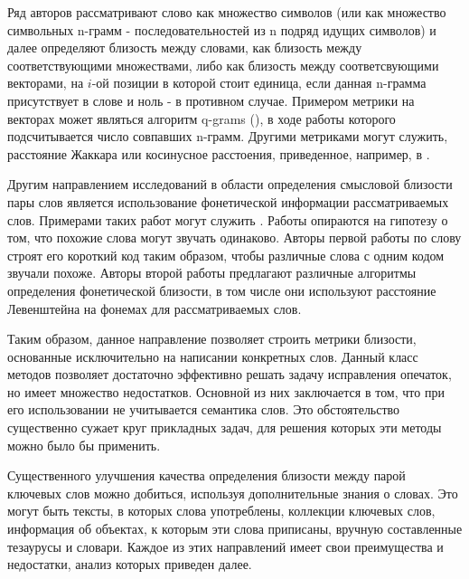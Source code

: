Ряд авторов рассматривают слово как множество символов (или как множество символьных n-грамм - последовательностей из n подряд идущих символов) и далее определяют близость между словами, как близость между соответствующими множествами, либо как близость между соответсвующими векторами, на $i$-ой позиции в которой стоит единица, если данная n-грамма присутствует в слове и ноль - в противном случае. Примером метрики на векторах может являться алгоритм q-grams (\cite{qgrams}), в ходе работы которого подсчитывается число совпавших n-грамм. Другими метриками могут служить,  расстояние Жаккара или косинусное расстоения, приведенное, например, в \cite{sim_metr}.

Другим направлением исследований в области определения смысловой близости пары слов является использование фонетической информации рассматриваемых слов. Примерами таких работ могут служить \cite{soundex,phone_sim}. Работы опираются на гипотезу о том, что похожие слова могут звучать одинаково. Авторы первой работы по слову строят его короткий код таким образом, чтобы различные слова с одним кодом звучали похоже. Авторы второй работы предлагают различные алгоритмы определения фонетической близости, в том числе они используют расстояние Левенштейна на фонемах для рассматриваемых слов.

Таким образом, данное направление позволяет строить метрики близости, основанные исключительно на написании конкретных слов. Данный класс методов позволяет достаточно эффективно решать задачу исправления опечаток, но имеет множество недостатков. Основной из них заключается в том, что при его использовании не учитывается семантика слов. Это обстоятельство существенно сужает круг прикладных задач, для решения которых эти методы можно было бы применить. 

Существенного улучшения качества определения близости между парой ключевых слов можно добиться, используя дополнительные знания о словах. Это могут быть тексты, в которых слова употреблены, коллекции ключевых слов, информация об объектах, к которым эти слова приписаны, вручную составленные тезаурусы и словари. Каждое из этих направлений имеет свои преимущества и недостатки, анализ которых приведен далее.

